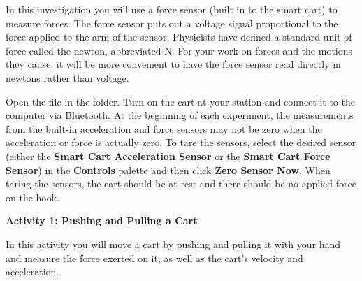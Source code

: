 In this investigation you will use a force sensor (built in to the smart cart) to measure forces. The force sensor puts out a voltage signal proportional to the force applied to the arm of the sensor. Physicists have defined a standard unit of force called the newton, abbreviated N. For your work on forces and the motions they cause, it will be more convenient to have the force sensor read directly in newtons rather than voltage. 

Open the  file in the \filename{\coursefolder} folder. Turn on the cart at your station and connect it to the computer via Bluetooth. At the beginning of each experiment, the measurements from the built-in acceleration and force sensors may not be zero when the acceleration or force is actually zero. To tare the sensors, select the desired sensor (either the \textbf{Smart Cart Acceleration Sensor} or the \textbf{Smart Cart Force Sensor}) in the \textbf{Controls} palette and then click \textbf{Zero Sensor Now}. When taring the sensors, the cart should be at rest and there should be no applied force on the hook.

%

\textbf{Activity 1: Pushing and Pulling a Cart} 

In this activity you will move a cart by pushing and pulling it with your hand and measure the force exerted on it, as well as the cart's velocity and acceleration. 


